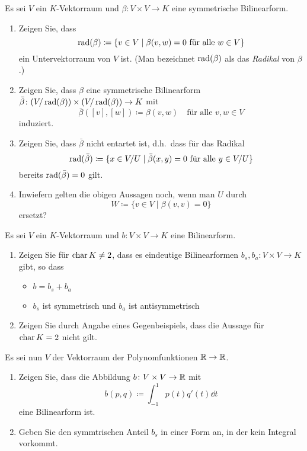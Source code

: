 \documentclass[a4paper,10pt]{scrartcl}
\begin{document}
\begin{question}
  Es sei $V$ ein $K$-Vektorraum und $\beta \colon V \times V \to K$ eine symmetrische Bilinearform.
  \begin{enumerate}[leftmargin=*]
    \item
      Zeigen Sie, dass
      \[
        \operatorname{rad}(\beta) \coloneqq \{ v \in V \mid \text{$\beta(v, w) = 0$ für alle $w \in V$} \}
      \]
      ein Untervektorraum von $V$ ist.
      (Man bezeichnet $\operatorname{rad}(\beta)$ als das \emph{Radikal} von $\beta$.)
    \item
      Zeigen Sie, dass $\beta$ eine symmetrische Bilinearform $\bar{\beta} \colon (V\!/ \operatorname{rad}(\beta)) \times (V\!/\operatorname{rad}(\beta)) \to K$ mit
      \[
        \bar{\beta}([v], [w])
        \coloneqq
        \beta(v,w)
        \quad
        \text{für alle $v, w \in V$}
      \]
      induziert.
    \item
      Zeigen Sie, dass $\bar{\beta}$ nicht entartet ist, d.h.\ dass für das Radikal
      \[
                  \operatorname{rad}(\bar{\beta})
        \coloneqq \{ x \in V\!/U \mid \text{$\bar{\beta}(x,y) = 0$ für alle $y \in V\!/U$} \}
      \]
      bereits $\operatorname{rad}(\bar{\beta}) = 0$ gilt.
    \item
      Inwiefern gelten die obigen Aussagen noch, wenn man $U$ durch
      \[
        W \coloneqq \{v \in V \mid \beta(v,v) = 0\}
      \]
      ersetzt?
  \end{enumerate}
\end{question}


\begin{question}
   Es sei $V$ ein $K$-Vektorraum und $b \colon V \times V \to K$ eine Bilinearform.
  \begin{enumerate}
    \item
      Zeigen Sie für $\operatorname{char} K \neq 2$, dass es eindeutige Bilinearformen $b_s, b_a \colon V \times V \to K$ gibt, so dass
      \begin{itemize}
        \item
          $b = b_s + b_a$
        \item
          $b_s$ ist symmetrisch und $b_a$ ist antisymmetrisch
      \end{itemize}
    \item
      Zeigen Sie durch Angabe eines Gegenbeispiels, dass die Aussage für $\operatorname{char} K = 2$ nicht gilt.
  \end{enumerate}
  Es sei nun $V$ der Vektorraum der Polynomfunktionen $\mathbb{R} \to \mathbb{R}$.
  \begin{enumerate}[resume]
    \item
      Zeigen Sie, dass die Abbildung $b \colon V \times V \to \mathbb{R}$ mit
      \[
        b(p, q) \coloneqq \int_{-1}^1 p(t) q'(t) \dd{t}
      \]
      eine Bilinearform ist.
    \item
      Geben Sie den symmtrischen Anteil $b_s$ in einer Form an, in der kein Integral vorkommt.
  \end{enumerate}
\end{question}
\end{document}
